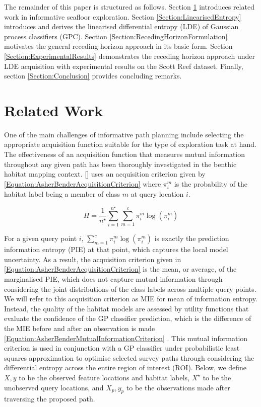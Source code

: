 \documentclass{article}
\newcommand{\incite}[1]{\citeauthor{#1} [\citeyear{#1}]}
\begin{document}
	The remainder of this paper is structured as follows. Section \ref{Section:RelatedWork} introduces related work in informative seafloor exploration. Section \ref{Section:LinearisedEntropy} introduces and derives the linearised differential entropy (LDE) of Gaussian process classifiers (GPC). Section \ref{Section:RecedingHorizonFormulation} motivates the general receding horizon approach in its basic form. Section \ref{Section:ExperimentalResults} demonstrates the receding horizon approach under LDE acquisition with experimental results on the Scott Reef dataset. Finally, section \ref{Section:Conclusion} provides concluding remarks.
	
\section{Related Work}
\label{Section:RelatedWork}

	One of the main challenges of informative path planning include selecting the appropriate acquisition function suitable for the type of exploration task at hand. The effectiveness of an acquisition function that measures mutual information throughout any given path has been thoroughly investigated in the benthic habitat mapping context. \incite{AsherBender} uses an acquisition criterion given by \eqref{Equation:AsherBenderAcquisitionCriterion} where $\pi^{m}_{i}$ is the probability of the habitat label being a member of class $m$ at query location $i$. 
	
	\begin{equation}
		H = \frac{1}{n^{\star}} \sum_{i = 1}^{n^{\star}} \sum_{m = 1}^{c} \pi^{m}_{i} \log(\pi^{m}_{i})
	\label{Equation:AsherBenderAcquisitionCriterion}
	\end{equation}
	
	For a given query point $i$, $\sum_{m = 1}^{c} \pi^{m}_{i} \log(\pi^{m}_{i})$ is exactly the prediction information entropy (PIE) at that point, which captures the local model uncertainty. As a result, the acquisition criterion given in \eqref{Equation:AsherBenderAcquisitionCriterion} is the mean, or average, of the marginalised PIE, which does not capture mutual information through considering the joint distributions of the class labels across multiple query points. We will refer to this acquisition criterion as MIE for mean of information entropy. Instead, the quality of the habitat models are assessed by utility functions that evaluate the confidence of the GP classifier prediction, which is the difference of the MIE before and after an observation is made \eqref{Equation:AsherBenderMutualInformationCriterion} \cite{Rigby:ROB20372}. This mutual information criterion is used in conjunction with a GP classifier under probabilistic least squares approximation to optimise selected survey paths through considering the differential entropy across the entire region of interest (ROI). Below, we define $X, y$ to be the observed feature locations and habitat labels, $X^{\star}$ to be the unobserved query locations, and $X_{p}, y_{p}$ to be the observations made after traversing the proposed path.
\end{document}
